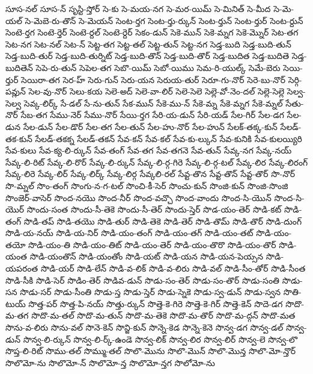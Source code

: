 {సూస-నల్
సూస-న్
సృస్టి-స్తోర్
సె-కు
సె-మయ-నగ
సె-మర-యిమ్
సె-మినిత్
సె-మీద
సె-మె-యల్
సె-మెబె-రు-తొన్
సె-మెయన్
సెంట-ర్తగ
సెంట-ర్తు-ర్కున్
సెంట-ర్తున్
సెంట-ర్తుర్
సెంట-ర్దున్
సెంటె-ర్తగ
సెంటె-ర్తెర్
సెంటె-ర్దల్
సెంటె-ర్దెర్
సెకం-డున్
సెకె-మున్
సెకె-మ్నగ
సెకె-మ్నొర్
సెట-తగ
సెట-నగ
సెట-నల్
సెట-న్
సెట్ట-తగ
సెట్ట-తల్
సెట్ట-తున్
సెట్ట-నగ
సెడ్త-బుది
సెడ్త-బుది-తున్
సెడ్త-బుది-తుర్
సెడ్త-బుది-తుర్నిట్
సెడ్త-బుది-తొన్
సెడ్త-బుది-తొర్
సెడ్త-బుదిత
సెడ్త-బుదితె
సెడ్త-బుదితెన్
సెపె-రు-తున్
సెపెల-తగ
సెబొ-యిమ్
సెబో-యిము
సెమ-రి-యుల్క్
సెమే-బెరు
సెయి-ర్తుర్
సెయిరా-తగ
సెర-హ్
సెరు-గున్
సెరు-యన
సెరుయ-తుర్
సెరూ-గు-నొర్
సెరె-బు-నొర్
సెర్గి-పవ్లున్
సెల-వు-నొర్
సెలు-కయ
సెలె-అద్
సెలె-వా-లిర్
సెలె-సెలె
సెల్లె-వో-నెం-దల్
సెల్లె-సెల్లె
సెల్వ-సెల్వ
సెవ్క-లిర్క్
సే-డల్
సే-ను-తున్
సేక-మున్
సేకె-ము-న్
సేకె-మ్న
సేకె-మ్నగ
సేకె-మ్నల్
సేతు-నొర్
సేబ-తగ
సేము-నెర్
సేము-నొర్
సేయి-ర్తగ
సేరి-య-డున్
సేరి-యడ్
సేల-గిర్
సేల-డగ
సేల-డున
సేల-డున్
సేల-డొర్
సేల-తగ
సేల-తున్
సేల-హు-నొర్
సేల-హున్
సేలక్-తక్క-కున్
సేలడ్-తక-కున్
సేలడ్-తకక్న
సేలడ్-తకన్
సేవ-కన్
సేవ-కల్
సేవ-కు-ల్కున్
సేవ-కునికి
సేవ-కులయ్యిరి
సేవ-కులు
సేవ-క్య-లి-ర్కున్
సేవ-తంగ్
సేవ-తగ
సేవ-తగనె
సేవ-తున్
సేవ్క-నగ
సేవ్క-నయ్
సేవ్క-లి-రిట్
సేవ్క-లి-రొర్
సేవ్క-లి-ర్కున్
సేవ్క-లి-ర్గ-గిరె
సేవ్క-లి-ర్గ-టల్
సేవ్క-లిర
సేవ్క-లిరంగ్
సేవ్క-లిరె
సేవ్క-లిర్
సేవ్క-లిర్క్
సేవ్క-లిర్గ
సేవ్కలి-రల్
సేవ్ట-తొన
సేవ్ట-తొన్
సేవ్ట-తొర్
సొ-నొర్
సొ-మ్నల్
సొం-తంగ్
సొంగు-న-గ-టల్
సొంచి-కీ-సెర్
సొంచు-కున్
సొంజి-కున్
సొంజి-సొంజి
సొంజెర్-వాసెర్
సొంద-నయొ
సొంద-నీర్
సొంద-వచ్చొ
సొంద-వాందు
సొంద-సి-యొన్
సొంద-సి-యొర్
సొందు-సంత
సొందు-సీ-తెకె
సొందు-సీ-తెర్
సొందు-స్తెర్
సొడ-యం-తెర్
సొడి-కట్
సొడి-తంగ్
సొడి-తప్
సొడి-తయొ
సొడి-తుర్
సొడి-తెకె
సొడి-తెర్
సొడి-తొమ్
సొడి-తొర్
సొడి-దుంగ్
సొడి-య-నయ్
సొడి-య-నిర్
సొడి-యం-తంగ్
సొడి-యం-తగ్
సొడి-యం-తట్
సొడి-యం-తయో
సొడి-యం-తి
సొడి-యం-తిట్
సొడి-యం-తెర్
సొడి-యం-తొరొ
సొడి-యం-తొర్
సొడి-యంత
సొడి-యంతొన్
సొడి-యంతోం
సొడి-యట్
సొడి-యన
సొడి-యన-పెయ్సన
సొడి-యపరంత
సొడి-యర్
సొడి-లేన్
సొడి-వ-లిక్
సొడి-వ-లిరు
సొడి-వల్
సొడి-సీం-తోర్
సొడి-సీంత
సొడి-సీకి
సొడి-సెర్
సొడిం-తెర్
సొడివ-డున్
సొడు-సం-తెర్
సొడు-సం-తొర్
సొడు-సంతి
సొడు-సన
సొడు-సర్
సొడు-సీంతి
సొడు-స్త
సొడు-స్తెర్
సొడు-స్నెకె
సొడు-స్వ-డున్
సొడు-స్వన
సొతి-టుయ్
సొత్త-పర్
సొత్త-పి-నయ్
సొత్తు-ర్కున్
సొత్తె-కె-గిరె
సొత్తె-కె-గిర్
సొత్తె-కెన్
సొదె-డగ
సొదొ-మ-తగ
సొదొ-మ-తల్
సొదొ-మ-తున్
సొదొ-మ-తెకె
సొదొ-మ-తొర్
సొదొ-మ-ద్గన్
సొదొ-మత
సొను-వ-లిరు
సొను-వల్
సొనె-కెన్
సొన్జి-కున్
సొన్నె-కెడ
సొన్నె-కెనె
సొన్వ-డగ
సొన్వ-డల్
సొన్వ-డున్
సొన్వ-లి-ర్కున్
సొన్వ-లి-ర్క్-ఉండె
సొన్వ-లిక్
సొన్వ-లిర
సొన్వ-లిర్
సొన్వ-లె
సొన్వ-లొ
సొప్త-లి-రిట్
సొము-తల్
సొమ్ము-తల్
సొలొ-మొను
సొలొ-మొన్
సొలొ-మొన్త
సొలొ-మో-న్తొర్
సొలొమో-ను
సొలొమో-న్
సొలొమో-న్త
సొలొమో-న్తగ
సొలోమో-ను
}
